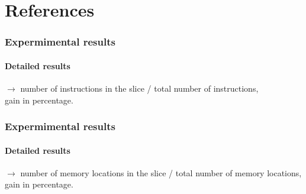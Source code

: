 \documentclass{beamer}
\begin{document}
  
  \appendix
  \section{References}
  \begin{frame}%
    \frametitle{\secname}
    \tiny
    
    
    
  \end{frame}

  \begin{frame}
    \frametitle{Expermimental results}
    \framesubtitle{Detailed results}

    \begin{table}
      \centering
      \scalebox{.5}{}
    \end{table}
    
    \vspace{-1em}
    \begin{center}
      \scriptsize $\rightarrow$ number of instructions in the slice / total number of
      instructions, \\ gain in percentage.
    \end{center}
  \end{frame}

  \begin{frame}
    \frametitle{Expermimental results}
    \framesubtitle{Detailed results}

    \begin{table}
      \centering
      \scalebox{.5}{}
    \end{table}

    \vspace{-1em}
    \begin{center}
      \scriptsize $\rightarrow$ number of memory locations in the slice / total number of
      memory locations, \\ gain in percentage.
    \end{center}
  \end{frame}

  
\end{document}
